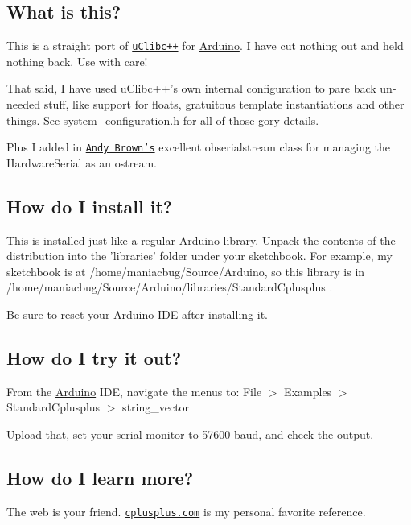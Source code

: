 \subsection*{What is this?}

This is a straight port of \href{http://cxx.uclibc.org/}{\tt u\-Clibc++} for \hyperlink{struct_arduino}{Arduino}. I have cut nothing out and held nothing back. Use with care!

That said, I have used u\-Clibc++'s own internal configuration to pare back un-\/needed stuff, like support for floats, gratuitous template instantiations and other things. See \hyperlink{system__configuration_8h}{system\-\_\-configuration.\-h} for all of those gory details.

Plus I added in \href{http://andybrown.me.uk/ws/2011/01/15/the-standard-template-library-stl-for-avr-with-c-streams/#IDComment246044033}{\tt Andy Brown's} excellent ohserialstream class for managing the Hardware\-Serial as an ostream.

\subsection*{How do I install it?}

This is installed just like a regular \hyperlink{struct_arduino}{Arduino} library. Unpack the contents of the distribution into the 'libraries' folder under your sketchbook. For example, my sketchbook is at /home/maniacbug/\-Source/\-Arduino, so this library is in /home/maniacbug/\-Source/\-Arduino/libraries/\-Standard\-Cplusplus .

Be sure to reset your \hyperlink{struct_arduino}{Arduino} I\-D\-E after installing it.

\subsection*{How do I try it out?}

From the \hyperlink{struct_arduino}{Arduino} I\-D\-E, navigate the menus to\-: File $>$ Examples $>$ Standard\-Cplusplus $>$ string\-\_\-vector

Upload that, set your serial monitor to 57600 baud, and check the output.

\subsection*{How do I learn more?}

The web is your friend. \href{http://cplusplus.com/reference/}{\tt cplusplus.\-com} is my personal favorite reference.

